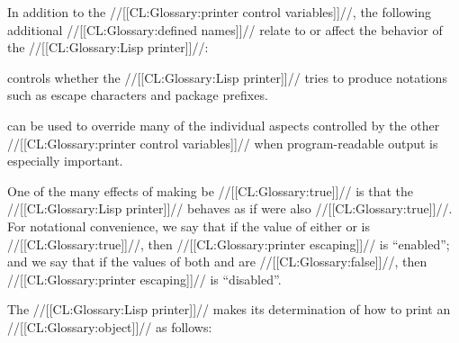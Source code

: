  

In addition to the //[[CL:Glossary:printer control variables]]//,  the following additional //[[CL:Glossary:defined names]]//  relate to or affect the behavior of the //[[CL:Glossary:Lisp printer]]//:



 controls whether the //[[CL:Glossary:Lisp printer]]// tries to produce notations such as escape characters and package prefixes.

 can be used to override many of the individual aspects controlled by the other  //[[CL:Glossary:printer control variables]]// when program-readable output is especially important.

 One of the many effects of making  be //[[CL:Glossary:true]]// is that the //[[CL:Glossary:Lisp printer]]// behaves as if  were also //[[CL:Glossary:true]]//. For notational convenience, we say that  if the value of either  or  is //[[CL:Glossary:true]]//,  then //[[CL:Glossary:printer escaping]]// is ``enabled''; and we say that if the values of both  and  are //[[CL:Glossary:false]]//,  then //[[CL:Glossary:printer escaping]]// is ``disabled''.

\endsubsubsubsection%

\endsubsubsection%

\endsubsection%

 


The //[[CL:Glossary:Lisp printer]]// makes its determination of how to print an //[[CL:Glossary:object]]// as follows:


